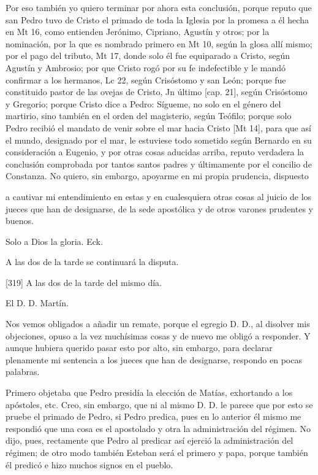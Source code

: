 Por eso también yo quiero terminar por ahora esta conclusión, porque reputo que san Pedro tuvo de Cristo el primado de toda la Iglesia por la promesa a él hecha en Mt 16, como entienden Jerónimo, Cipriano, Agustín y otros; por la nominación, por la que es nombrado primero en Mt 10, según la glosa allí mismo; por el pago del tributo, Mt 17, donde solo él fue equiparado a Cristo, según Agustín y Ambrosio; por que Cristo rogó por su fe indefectible y le mandó confirmar a los hermanos, Lc 22, según Crisóstomo y san León; porque fue constituido pastor de las ovejas de Cristo, Jn último [cap. 21], según Crisóstomo y Gregorio; porque Cristo dice a Pedro: Sígueme, no solo en el género del martirio, sino también en el orden del magisterio, según Teófilo; porque solo Pedro recibió el mandato de venir sobre el mar hacia Cristo [Mt 14], para que así el mundo, designado por el mar, le estuviese todo sometido según Bernardo en su consideración a Eugenio, y por otras cosas aducidas arriba, reputo verdadera la conclusión comprobada por tantos santos padres y últimamente por el concilio de Constanza. No quiero, sin embargo, apoyarme en mi propia prudencia, dispuesto

a cautivar mi entendimiento en estas y en cualesquiera otras cosas al juicio de los jueces que han de designarse, de la sede apostólica y de otros varones prudentes y buenos.

Solo a Dios la gloria. Eck.

A las dos de la tarde se continuará la disputa.

[319] A las dos de la tarde del mismo día.

El D. D. Martín.

Nos vemos obligados a añadir un remate, porque el egregio D. D., al disolver mis objeciones, opuso a la vez muchísimas cosas y de nuevo me obligó a responder. Y aunque hubiera querido pasar esto por alto, sin embargo, para declarar plenamente mi sentencia a los jueces que han de designarse, respondo en pocas palabras.

Primero objetaba que Pedro presidía la elección de Matías, exhortando a los apóstoles, etc. Creo, sin embargo, que ni al mismo D. D. le parece que por esto se pruebe el primado de Pedro, si Pedro predica, pues en lo anterior él mismo me respondió que una cosa es el apostolado y otra la administración del régimen. No dijo, pues, rectamente que Pedro al predicar así ejerció la administración del régimen; de otro modo también Esteban será el primero y papa, porque también él predicó e hizo muchos signos en el pueblo.


